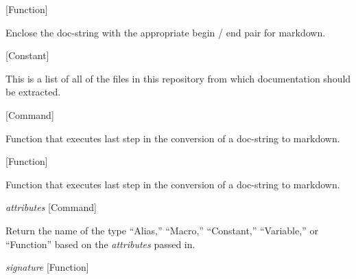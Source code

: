 \vspace{1em}
\noindent
{}
\usebox{\funcname}
 \hfill [Function]

\begin{doc-string}
Enclose the doc-string with the appropriate begin / end pair for markdown.
\end{doc-string}

\vspace{1em}
\noindent
{}
\usebox{\funcname}
 \hfill [Constant]

\begin{doc-string}
This is a list of all of the files in this repository from which documentation
should be extracted.
\end{doc-string}

\vspace{1em}
\noindent
{}
\usebox{\funcname}
 \hfill [Command]

\begin{doc-string}
Function that executes last step in the conversion of a doc-string to
markdown.
\end{doc-string}

\vspace{1em}
\noindent
{}
\usebox{\funcname}
 \hfill [Function]

\begin{doc-string}
Function that executes last step in the conversion of a doc-string to
markdown.
\end{doc-string}

\vspace{1em}
\noindent
{}
\usebox{\funcname}\emph{attributes}
 \hfill [Command]

\begin{doc-string}
Return the name of the type ``Alias,'' ``Macro,'' ``Constant,'' ``Variable,'' or
``Function'' based on the \emph{attributes} passed in.
\end{doc-string}

\vspace{1em}
\noindent
{}
\usebox{\funcname}\emph{signature}
 \hfill [Function]


